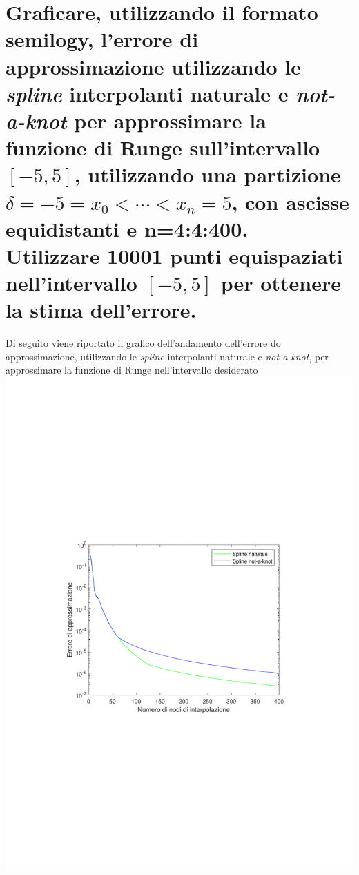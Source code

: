 \documentclass[10pt,a4paper]{article}
\begin{document}
\section{
Graficare, utilizzando il formato semilogy, l'errore di approssimazione utilizzando le
\textit{spline} interpolanti naturale e \textit{not-a-knot} per approssimare la funzione di Runge sull'intervallo $ [-5,5] $,
utilizzando una partizione $ \delta = {-5 = x_0 < \cdots < x_n = 5} $, con ascisse equidistanti e \textbf{n=4:4:400}.
\\
Utilizzare 10001 punti equispaziati nell'intervallo $ [-5,5] $ per ottenere la stima dell'errore.
}
Di seguito viene riportato il grafico dell'andamento dell'errore do approssimazione, utilizzando
le \textit{spline} interpolanti naturale e \textit{not-a-knot}, per approssimare la funzione di 
Runge nell'intervallo desiderato
\\
\includegraphics*[scale=0.80]{./esercizi/imgs/grafico_23.pdf}
\end{document}
